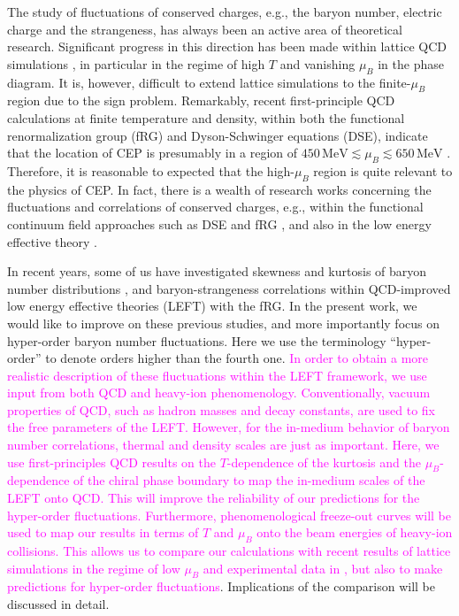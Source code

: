 \documentclass[%
reprint,
superscriptaddress,
showpacs,preprintnumbers,
 amsmath,amssymb,
 aps,
prd,
]{revtex4-1}
\newcommand{\colfab}[1]{\textcolor{magenta}{#1}}
\begin{document}
The study of fluctuations of conserved charges, e.g., the baryon number, electric charge and the strangeness, has always been an active area of theoretical research. Significant progress in this direction has been made within lattice QCD simulations \cite{Bazavov:2012vg,Borsanyi:2013hza,Borsanyi:2014ewa,Bazavov:2017dus,Bazavov:2017tot,Borsanyi:2018grb,Bazavov:2020bjn}, in particular in the regime of high $T$ and vanishing $\mu_B$ in the phase diagram. It is, however, difficult to extend lattice simulations to the finite-$\mu_B$ region due to the sign problem. Remarkably, recent first-principle QCD calculations at finite temperature and density, within both the functional renormalization group (fRG) and Dyson-Schwinger equations (DSE), indicate that the location of CEP is presumably in a region of $450\,\mathrm{MeV} \lesssim\mu_B\lesssim 650\,\mathrm{MeV}$ \cite{Fischer:2018sdj,Fu:2019hdw,Isserstedt:2019pgx,Gao:2020qsj}. Therefore, it is reasonable to expected that the high-$\mu_B$ region is quite relevant to the physics of CEP. In fact, there is a wealth of research works concerning the fluctuations and correlations of conserved charges, e.g., within the functional continuum field approaches such as DSE \cite{Xin:2014ela,Isserstedt:2019pgx} and fRG \cite{Skokov:2010wb,Skokov:2010uh,Morita:2014fda,Fu:2015naa,Fu:2015amv,Fu:2015naa,Almasi:2017bhq,Fu:2018qsk,Fu:2018swz}, and also in the low energy effective theory \cite{Fu:2009wy,Fu:2010ay,Karsch:2010hm,Schaefer:2011ex,Li:2018ygx}.

In recent years, some of us have investigated skewness and kurtosis of baryon number distributions \cite{Fu:2015naa,Fu:2015amv,Fu:2016tey}, and baryon-strangeness correlations \cite{Fu:2018qsk,Fu:2018swz} within QCD-improved low energy effective theories (LEFT) with the fRG. In the present work, we would like to improve on these previous studies, and more importantly focus on hyper-order baryon number fluctuations. Here we use the terminology ``hyper-order'' to denote orders higher than the fourth one.
\colfab{In order to obtain a more realistic description of these fluctuations within the LEFT framework, we use input from both QCD and heavy-ion phenomenology. Conventionally, vacuum properties of QCD, such as hadron masses and decay constants, are used to fix the free parameters of the LEFT. However, for the in-medium behavior of baryon number correlations, thermal and density scales are just as important. Here, we use first-principles QCD results on the $T$-dependence of the kurtosis and the $\mu_B$-dependence of the chiral phase boundary to map the in-medium scales of the LEFT onto QCD. This will improve the reliability of our predictions for the hyper-order fluctuations. Furthermore, phenomenological freeze-out curves will be used to map our results in terms of $T$ and $\mu_B$ onto the beam energies of heavy-ion collisions.
This allows us to
compare our calculations with recent results of lattice simulations in the regime of low $\mu_B$ and experimental data in \cite{Adam:2020unf,Nonaka:2020crv,Pandav:2020uzx}, but also to make predictions for hyper-order fluctuations}. Implications of the comparison will be discussed in detail.
\end{document}
